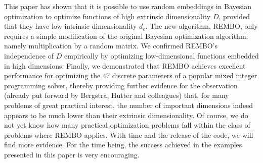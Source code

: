 \documentclass{article}
\begin{document}
This paper has shown that it is possible to use random embeddings in Bayesian optimization to optimize functions 
of high extrinsic dimensionality $D$, provided that they have low intrinsic dimensionality $d_e$. 
The new algorithm, REMBO, only requires a simple modification of the original Bayesian optimization algorithm; namely multiplication by a random matrix. 
We confirmed REMBO's independence of $D$ empirically by optimizing low-dimensional functions embedded in high dimensions. 
Finally, we demonstrated that REMBO achieves excellent performance for optimizing the 47 discrete parameters of a popular mixed integer programming solver,
thereby providing further evidence for the observation (already put forward by Bergstra, Hutter and colleagues) that, for many problems of great practical interest, the number of 
important dimensions indeed appears to be much lower than their extrinsic dimensionality. Of course, we do not yet know how many practical optimization problems fall within the class of problems where REMBO applies. With time and the release of the code, we will find more evidence. For the time being, the success achieved in the examples presented in this paper 
is very encouraging.










\small


\end{document}
